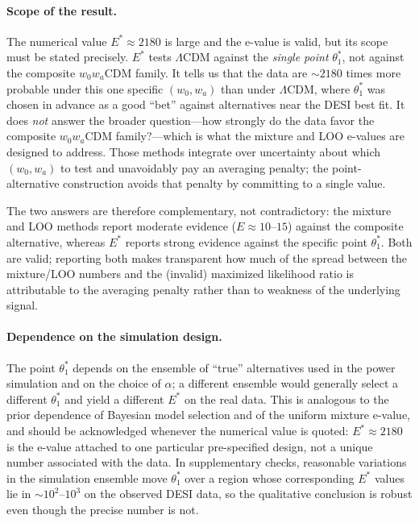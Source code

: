 \documentclass[11pt,a4paper]{article}
\newcommand{\LCDM}{$\Lambda$CDM}
\begin{document}
\paragraph{Scope of the result.} The numerical value $E^{*} \approx 2180$ is large and the e-value is valid, but its scope must be stated precisely. $E^{*}$ tests \LCDM{} against the \emph{single point} $\theta_1^*$, not against the composite $w_0w_a$CDM family. It tells us that the data are $\sim 2180$ times more probable under this one specific $(w_0, w_a)$ than under \LCDM, where $\theta_1^*$ was chosen in advance as a good ``bet'' against alternatives near the DESI best fit. It does \emph{not} answer the broader question---how strongly do the data favor the composite $w_0w_a$CDM family?---which is what the mixture and LOO e-values are designed to address. Those methods integrate over uncertainty about which $(w_0, w_a)$ to test and unavoidably pay an averaging penalty; the point-alternative construction avoids that penalty by committing to a single value.

The two answers are therefore complementary, not contradictory: the mixture and LOO methods report moderate evidence ($E \approx 10$--$15$) against the composite alternative, whereas $E^{*}$ reports strong evidence against the specific point $\theta_1^*$. Both are valid; reporting both makes transparent how much of the spread between the mixture/LOO numbers and the (invalid) maximized likelihood ratio is attributable to the averaging penalty rather than to weakness of the underlying signal.

\paragraph{Dependence on the simulation design.} The point $\theta_1^*$ depends on the ensemble of ``true'' alternatives used in the power simulation and on the choice of $\alpha$; a different ensemble would generally select a different $\theta_1^*$ and yield a different $E^{*}$ on the real data. This is analogous to the prior dependence of Bayesian model selection and of the uniform mixture e-value, and should be acknowledged whenever the numerical value is quoted: $E^{*} \approx 2180$ is the e-value attached to one particular pre-specified design, not a unique number associated with the data. In supplementary checks, reasonable variations in the simulation ensemble move $\theta_1^*$ over a region whose corresponding $E^{*}$ values lie in $\sim 10^{2}$--$10^{3}$ on the observed DESI data, so the qualitative conclusion is robust even though the precise number is not.
\end{document}
